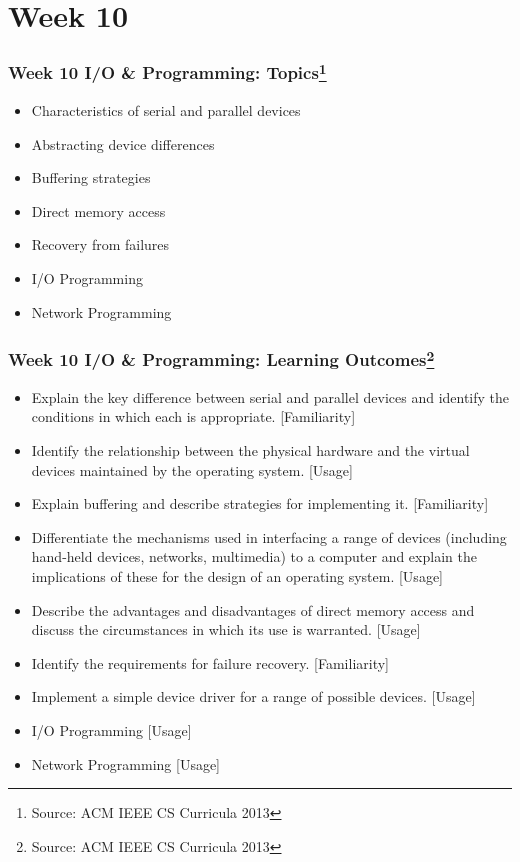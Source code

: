 
\section{Week 10}
\begin{frame}[fragile]
\frametitle{Week 10 I/O \& Programming:
Topics\footnote{Source: ACM IEEE CS Curricula 2013}}

\begin{itemize}
\item 
Characteristics of serial and parallel devices
\item 
Abstracting device differences
\item 
Buffering strategies
\item 
Direct memory access
\item 
Recovery from failures
\item
I/O Programming
\item
Network Programming
\end{itemize}
\end{frame}

\begin{frame}[fragile]
\frametitle{Week 10 I/O \& Programming:
Learning Outcomes\footnote{Source: ACM IEEE CS Curricula 2013}}

\begin{itemize}
\item Explain the key difference between serial and parallel devices and identify the conditions in which each is appropriate. [Familiarity]
\item Identify the relationship between the physical hardware and the virtual devices maintained by the operating system. [Usage]
\item Explain buffering and describe strategies for implementing it. [Familiarity]
\item Differentiate the mechanisms used in interfacing a range of devices (including hand-held devices, networks, multimedia) to a computer and explain the implications of these for the design of an operating system. [Usage]
\item Describe the advantages and disadvantages of direct memory access and discuss the circumstances in
which its use is warranted. [Usage]
\item Identify the requirements for failure recovery. [Familiarity]
\item Implement a simple device driver for a range of possible devices. [Usage]

\item I/O Programming [Usage]
\item Network Programming [Usage]
\end{itemize}

\end{frame}



